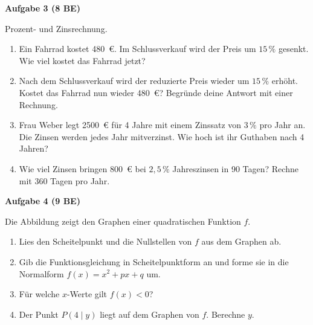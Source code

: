 \documentclass[12pt,a4paper]{article}
\newcommand{\aufgabe}[2]{\bigskip\par\textbf{Aufgabe #1 (#2 BE)}\par\nopagebreak\smallskip}
\begin{document}
\aufgabe{3}{8}
Prozent- und Zinsrechnung.
\begin{enumerate}
  \item Ein Fahrrad kostet \qty{480}{\euro}. Im Schlussverkauf wird der Preis um $15\,\%$ gesenkt. Wie viel
        kostet das Fahrrad jetzt?
  \item Nach dem Schlussverkauf wird der reduzierte Preis wieder um $15\,\%$ erhöht. Kostet das Fahrrad nun
        wieder \qty{480}{\euro}? Begründe deine Antwort mit einer Rechnung.
  \item Frau Weber legt \qty{2500}{\euro} für 4 Jahre mit einem Zinssatz von $3\,\%$ pro Jahr an. Die Zinsen
        werden jedes Jahr mitverzinst. Wie hoch ist ihr Guthaben nach 4 Jahren?
  \item Wie viel Zinsen bringen \qty{800}{\euro} bei $2{,}5\,\%$ Jahreszinsen in 90 Tagen? Rechne mit
        360 Tagen pro Jahr.
\end{enumerate}

\aufgabe{4}{9}
Die Abbildung zeigt den Graphen einer quadratischen Funktion $f$.

\begin{center}
\end{center}
\begin{enumerate}
  \item Lies den Scheitelpunkt und die Nullstellen von $f$ aus dem Graphen ab.
  \item Gib die Funktionsgleichung in Scheitelpunktform an und forme sie in die Normalform
        $f(x) = x^2 + px + q$ um.
  \item Für welche $x$-Werte gilt $f(x) < 0$?
  \item Der Punkt $P(4\mid y)$ liegt auf dem Graphen von $f$. Berechne $y$.
\end{enumerate}
\end{document}
